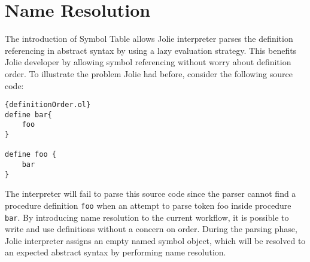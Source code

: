
\section{ Name Resolution }

The introduction of Symbol Table allows Jolie interpreter parses the definition referencing in abstract syntax by using a lazy evaluation strategy. This benefits Jolie developer by allowing symbol referencing without worry about definition order. To illustrate the problem Jolie had before, consider the following source code:

\begin{listing}[ht]
    \lstset{language=Jolie,
        style=codeStyle
    }
    \begin{lstlisting}[frame=tlrb]{definitionOrder.ol}
define bar{
    foo
}

define foo {
    bar
}
\end{lstlisting}
\end{listing}

The interpreter will fail to parse this source code since the parser cannot find a procedure definition \texttt{foo} when an attempt to parse token foo inside procedure \texttt{bar}.
By introducing name resolution to the current workflow, it is possible to write and use definitions without a concern on order. During the parsing phase, Jolie interpreter assigns an empty named symbol object, which will be resolved to an expected abstract syntax by performing name resolution.